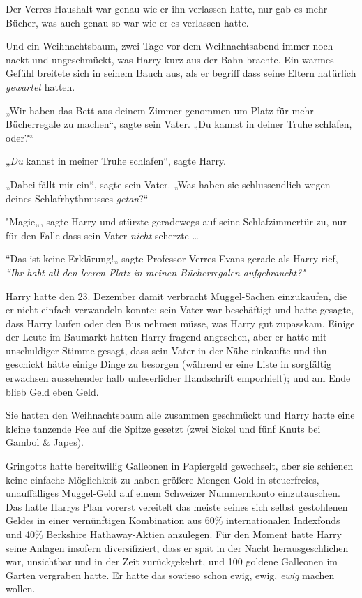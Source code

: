 {Der Verres-Haushalt war genau wie er ihn verlassen hatte, nur gab es mehr Bücher, was auch genau so war wie er es verlassen hatte.

Und ein Weihnachtsbaum, zwei Tage vor dem Weihnachtsabend immer noch nackt und ungeschmückt, was Harry kurz aus der Bahn brachte. Ein warmes Gefühl breitete sich in seinem Bauch aus, als er begriff dass seine Eltern natürlich \emph{gewartet} hatten.

„Wir haben das Bett aus deinem Zimmer genommen um Platz für mehr Bücherregale zu machen“, sagte sein Vater. „Du kannst in deiner Truhe schlafen, oder?“

„\emph{Du} kannst in meiner Truhe schlafen“, sagte Harry.

„Dabei fällt mir ein“, sagte sein Vater. „Was haben sie schlussendlich wegen deines Schlafrhythmusses \emph{getan}?“

"Magie„, sagte Harry und stürzte geradewegs auf seine Schlafzimmertür zu, nur für den Falle dass sein Vater \emph{nicht} scherzte …

“Das ist keine Erklärung!„ sagte Professor Verres-Evans gerade als Harry rief, \emph{“Ihr habt all den leeren Platz in meinen Bücherregalen aufgebraucht?"}

Harry hatte den 23. Dezember damit verbracht Muggel-Sachen einzukaufen, die er nicht einfach verwandeln konnte; sein Vater war beschäftigt und hatte gesagte, dass Harry laufen oder den Bus nehmen müsse, was Harry gut zupasskam. Einige der Leute im Baumarkt hatten Harry fragend angesehen, aber er hatte mit unschuldiger Stimme gesagt, dass sein Vater in der Nähe einkaufte und ihn geschickt hätte einige Dinge zu besorgen (während er eine Liste in sorgfältig erwachsen aussehender halb unleserlicher Handschrift emporhielt); und am Ende blieb Geld eben Geld.

Sie hatten den Weihnachtsbaum alle zusammen geschmückt und Harry hatte eine kleine tanzende Fee auf die Spitze gesetzt (zwei Sickel und fünf Knuts bei Gambol \& Japes).

Gringotts hatte bereitwillig Galleonen in Papiergeld gewechselt, aber sie schienen keine einfache Möglichkeit zu haben größere Mengen Gold in steuerfreies, unauffälliges Muggel-Geld auf einem Schweizer Nummernkonto einzutauschen. Das hatte Harrys Plan vorerst vereitelt das meiste seines sich selbst gestohlenen Geldes in einer vernünftigen Kombination aus 60\% internationalen Indexfonds und 40\% Berkshire Hathaway-Aktien anzulegen. Für den Moment hatte Harry seine Anlagen insofern diversifiziert, dass er spät in der Nacht herausgeschlichen war, unsichtbar und in der Zeit zurückgekehrt, und 100 goldene Galleonen im Garten vergraben hatte. Er hatte das sowieso schon ewig, ewig, \emph{ewig} machen wollen.

}
